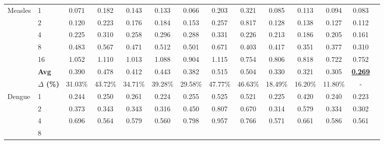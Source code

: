 \begin{table*}[t]
{\begin{tabular}{llcccccccccccc}
    \midrule
    \multirow{7}{*}{Measles} 
          & 1  
            & \cellcolor{low2}0.071 & 0.182 & 0.143 & 0.133 
            & \cellcolor{low1}0.066 & 0.203 & 0.321 & 0.085 
            & 0.113 & 0.094 & \cellcolor{low3}0.083 \\[2pt]
          & 2  
            & \cellcolor{low2}0.120 & 0.223 & 0.176 & 0.184 
            & 0.153 & 0.257 & 0.817 & 0.128 
            & 0.138 & \cellcolor{low3}0.127 & \cellcolor{low1}0.112 \\[2pt]
          & 4  
            & 0.225 & 0.310 & 0.258 & 0.296 
            & 0.288 & 0.331 & 0.226 & 0.213 
            & \cellcolor{low2}0.186 & \cellcolor{low3}0.205 & \cellcolor{low1}0.161 \\[2pt]
          & 8  
            & 0.483 & 0.567 & 0.471 & 0.512 
            & 0.501 & 0.671 & 0.403 & 0.417 
            & \cellcolor{low2}0.351 & \cellcolor{low3}0.377 & \cellcolor{low1}0.310 \\[2pt]
          & 16 
            & 1.052 & 1.110 & 1.013 & 1.088 
            & 0.904 & 1.115 & \cellcolor{low3}0.754 & 0.806 
            & 0.818 & \cellcolor{low1}0.722 & \cellcolor{low2}0.752 \\[2pt]
        & \textbf{Avg} 
          & 0.390 & 0.478 & 0.412 & 0.443 
          & 0.382 & 0.515 & 0.504 & 0.330 
          & \cellcolor{low3}0.321 & \cellcolor{low2}0.305 
          & \cellcolor{low1}\textbf{\underline{0.269}} \\
        & \textbf{$\Delta$ (\%)} 
          & 31.03\% & 43.72\% & 34.71\% & 39.28\% & 29.58\% 
          & 47.77\% & 46.63\% & 18.49\% & 16.20\% & 11.80\% & - \\
    \midrule
    \multirow{7}{*}{Dengue} 
      & 1  
        & 0.244 & 0.250 & 0.261 & \cellcolor{low2}0.224 
        & 0.255 & 0.525 & 0.521 & \cellcolor{low3}0.225 
        & 0.420 & 0.240 & \cellcolor{low1}0.223 \\[2pt]
      & 2  
        & 0.373 & 0.343 & 0.343 & \cellcolor{low3}0.316 
        & 0.450 & 0.807 & 0.670 & \cellcolor{low2}0.314 
        & 0.579 & 0.334 & \cellcolor{low1}0.302 \\[2pt]
      & 4  
        & 0.696 & \cellcolor{low3}0.564 & 0.579 & \cellcolor{low1}0.560 
        & 0.798 & 0.957 & 0.766 & 0.571 
        & 0.661 & 0.586 & \cellcolor{low2}0.561 \\[2pt]
      & 8  

\end{tabular}}
\end{table*}
